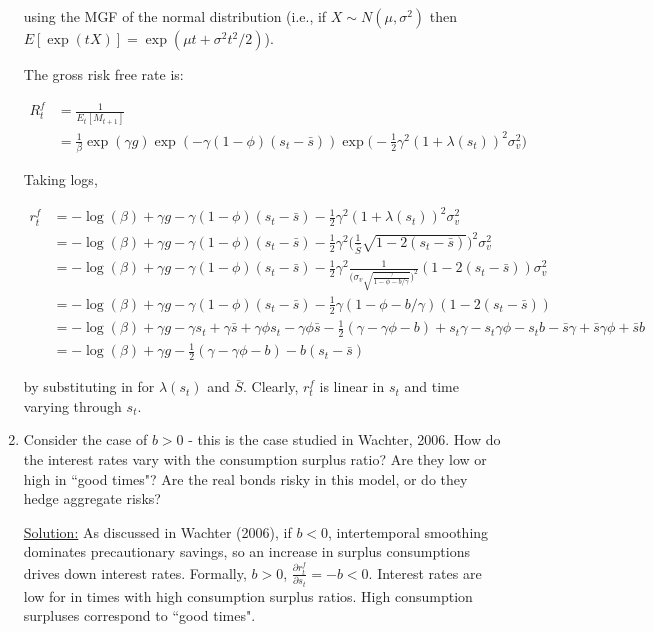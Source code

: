 \documentclass{article}
\begin{document}
\begin{enumerate}
using the MGF of the normal distribution (i.e., if $X \sim N(\mu, \sigma^2)$ then $E[\exp(tX)] = \exp(\mu t + \sigma^2 t^2/2)$).

The gross risk free rate is:

\begin{align*}
R^f_t 
&= \frac{1}{E_t[M_{t+1}]} \\
&= \frac{1}{\beta} \exp(\gamma g) \exp(-\gamma(1 - \phi)(s_t - \bar{s})) \exp\Bigg(-\frac{1}{2}\gamma^2 (1+\lambda(s_t))^2\sigma_v^2\Bigg)
\end{align*}

Taking logs,

\begin{align*}
r^f_t 
&= -\log(\beta) + \gamma g - \gamma(1 - \phi)(s_t - \bar{s}) - \frac{1}{2}\gamma^2 (1+\lambda(s_t))^2\sigma_v^2\\
&= -\log(\beta) + \gamma g - \gamma(1 - \phi)(s_t - \bar{s}) - \frac{1}{2}\gamma^2 \Bigg(\frac{1}{\bar{S}} \sqrt{1 - 2(s_t-\bar{s})}\Bigg)^2\sigma_v^2\\
&= -\log(\beta) + \gamma g - \gamma(1 - \phi)(s_t - \bar{s}) - \frac{1}{2}\gamma^2 \frac{1}{\Bigg(\sigma_v \sqrt{\frac{\gamma}{1- \phi - b/\gamma}}
\Bigg)^2} (1 - 2(s_t-\bar{s}))\sigma_v^2\\
&= -\log(\beta) + \gamma g - \gamma(1 - \phi)(s_t - \bar{s}) - \frac{1}{2}\gamma (1- \phi - b/\gamma)(1 - 2(s_t-\bar{s}))\\
&= -\log(\beta) + \gamma g - \gamma s_t + \gamma \bar{s} + \gamma \phi s_t - \gamma \phi \bar{s} - \frac{1}{2} (\gamma - \gamma \phi - b) + s_t \gamma - s_t \gamma \phi - s_t b - \bar{s} \gamma + \bar{s} \gamma \phi + \bar{s} b\\
&= -\log(\beta) + \gamma g  - \frac{1}{2} (\gamma - \gamma \phi - b)  -  b (s_t - \bar{s})
\end{align*}

by substituting in for $\lambda(s_t)$ and $\bar{S}$.  Clearly, $r^f_t$ is linear in $s_t$ and time varying through $s_t$.

\pagebreak

\item Consider the case of $b > 0$ - this is the case studied in Wachter, 2006. How do the interest rates vary with the consumption surplus ratio? Are they low or high in ``good times"? Are the real bonds risky in this model, or do they hedge aggregate risks?

\underline{Solution:} As discussed in Wachter (2006), if $b <0$, intertemporal smoothing dominates precautionary savings, so an increase in surplus consumptions drives down interest rates. Formally, $b > 0$, $\frac{\partial r^f_t }{\partial s_t} = -b < 0$. Interest rates are low for in times with high consumption surplus ratios. High consumption surpluses correspond to ``good times".


\end{enumerate}
\end{document}
